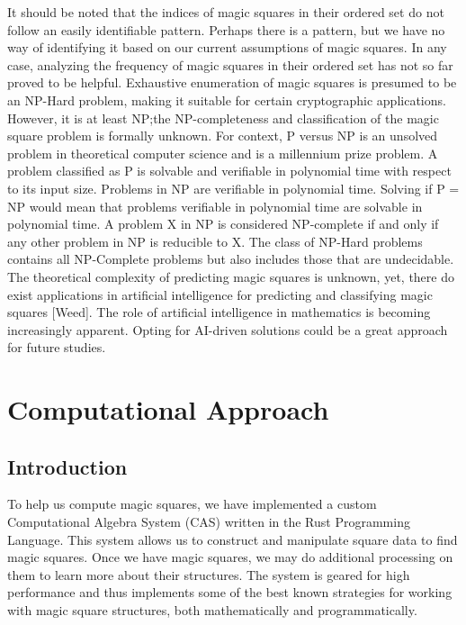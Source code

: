 \documentclass[12pt]{report}
\begin{document}
\par It should be noted that the indices of magic squares in their ordered set do not follow an
easily identifiable pattern. Perhaps there is a pattern, but we have no way of identifying it based
on our current assumptions of magic squares. In any case, analyzing the frequency of magic squares
in their ordered set has not so far proved to be helpful. Exhaustive enumeration of magic squares
is presumed to be an NP-Hard problem, making it suitable for certain cryptographic applications.
However, it is at least NP;\@ the NP-completeness and classification of the magic square problem is
formally unknown. For context, P versus NP is an unsolved problem in theoretical computer science
and is a millennium prize problem. A problem classified as P is solvable and verifiable in
polynomial time with respect to its input size. Problems in NP are verifiable in polynomial time.
Solving if P = NP would mean that problems verifiable in polynomial time are solvable in polynomial
time. A problem X in NP is considered NP-complete if and only if any other problem in NP is
reducible to X. The class of NP-Hard problems contains all NP-Complete problems but also includes
those that are undecidable. The theoretical complexity of predicting magic squares is unknown, yet,
there do exist applications in artificial intelligence for predicting and classifying magic squares
  [Weed]. The role of artificial intelligence in mathematics is becoming increasingly apparent.
Opting for AI-driven solutions could be a great approach for future studies.

\chapter{Computational Approach}

\section{Introduction}

\par To help us compute magic squares, we have implemented a custom Computational Algebra System
(CAS) written in the Rust Programming Language. This system allows us to construct and manipulate
square data to find magic squares. Once we have magic squares, we may do additional processing on
them to learn more about their structures. The system is geared for high performance and thus
implements some of the best known strategies for working with magic square structures, both
mathematically and programmatically.
\end{document}
